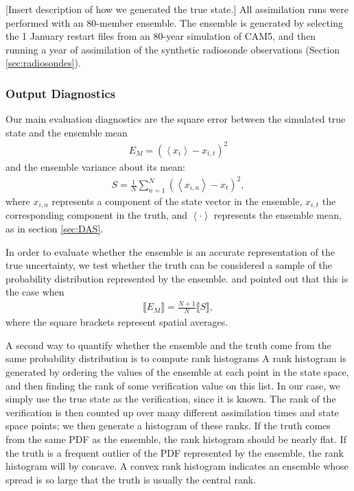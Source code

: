 \textcolor{alert}{[Insert description of how we generated the true state.]}
All assimilation runs were performed with an 80-member ensemble.
The ensemble is generated by selecting the 1 January restart files from an 80-year simulation of CAM5, and then running a year of assimilation of the synthetic radiosonde observations (Section \ref{sec:radiosondes}).


\subsubsection{Output Diagnostics}
Our main evaluation diagnostics are the square error between the simulated true state and the ensemble mean
\begin{eqnarray}
E_M = \left(
\left< x_i \right>-x_{i,t}
\right)^2
\end{eqnarray}
and the ensemble variance about its mean:
\begin{eqnarray}
S = 
\frac{1}{N}
\sum_{n=1}^N
\left(
\left< x_{i,n} \right>-x_t
\right)^2,
\end{eqnarray}
where $x_{i,n}$ represents a component of the state vector in the ensemble,  $x_{i,t}$ the corresponding component in the truth, and $\left< \cdot \right>$ represents the ensemble mean, as in section \ref{sec:DAS}.

In order to evaluate whether the ensemble is an accurate representation of the true uncertainty, we  test whether the truth can be considered a sample of the probability distribution represented by the ensemble.
 \citet{Huntley2009} and \citet{Murphy1988} pointed out that this is the case when 
\begin{eqnarray}
\llbracket E_M \rrbracket = \frac{N+1}{N} \llbracket S \rrbracket, 
\label{eq:EvsS}
\end{eqnarray}
where the square brackets represent spatial averages. 

A second way to quantify whether the ensemble and the truth come from the same probability distribution is to compute rank histograms \citep[and references therein]{Hamill2001}
A rank histogram is generated by ordering the values of the ensemble at each point in the state space, and then finding the rank of some verification value on this list.
In our case, we simply use the true state as the verification, since it is known.
The rank of the verification is then counted up over many different assimilation times and state space points; we then generate a histogram of these ranks.
If the truth comes from the same PDF as the ensemble, the rank histogram should be nearly flat.  
If the truth is a frequent outlier of the PDF represented by the ensemble, the rank histogram will by concave.
A convex rank histogram indicates an ensemble whose spread is so large that the truth is usually the central rank. 

